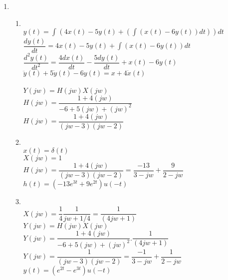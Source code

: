 \documentclass[10pt,a4paper, margin=1in]{article}
\begin{document}
\begin{enumerate}
\item 
\ \\
    \begin{enumerate}
    \item %
    \ \\
    $y(t) = \int_{}^{} (4x(t)-5y(t)+(\int (x(t)-6y(t))dt))dt$\\
    $\dfrac{d y(t)}{dt}= 4x(t) - 5y(t) + \int (x(t)-6y(t))dt$\\
    $\dfrac{d^2 y(t)}{dt^2} = \dfrac{4d x(t)}{dt} - \dfrac{5d y(t)}{dt} + x(t) -6y(t)$\\
    $\ddot{y}(t) + 5\dot{y}(t)-6y(t) = x+4\dot{x}(t)$\\
    \ \\
  $Y(jw)=H(jw)X(jw)$\\
  $H(jw)=\dfrac{1+4(jw)}{-6+5(jw)+(jw)^2}$\\
  $H(jw)=\dfrac{1+4(jw)}{(jw-3)(jw-2)}$\\
   \item %
  \ \\
  $x(t)=\delta(t)$\\
  $X(jw)=1$\\
  $H(jw)=\dfrac{1+4(jw)}{(jw-3)(jw-2)}= \dfrac{-13}{3-jw}+\dfrac{9}{2-jw}$\\
  $h(t)=(-13e^{3t}+9e^{2t})u(-t)$
  \item %
  \ \\
  $X(jw)=\dfrac{1}{4}\dfrac{1}{jw+1/4}=\dfrac{1}{(4jw+1)}$\\
   $Y(jw)=H(jw)X(jw)$\\
   $Y(jw)=\dfrac{1+4(jw)}{-6+5(jw)+(jw)^2}.\dfrac{1}{(4jw+1)}$\\
   $Y(jw)=\dfrac{1}{(jw-3)(jw-2)}=\dfrac{-1}{3-jw}+\dfrac{1}{2-jw}$\\
 $y(t)= (e^{2t}-e^{3t})u(-t)$
    \end{enumerate}



\end{enumerate}
\end{document}
